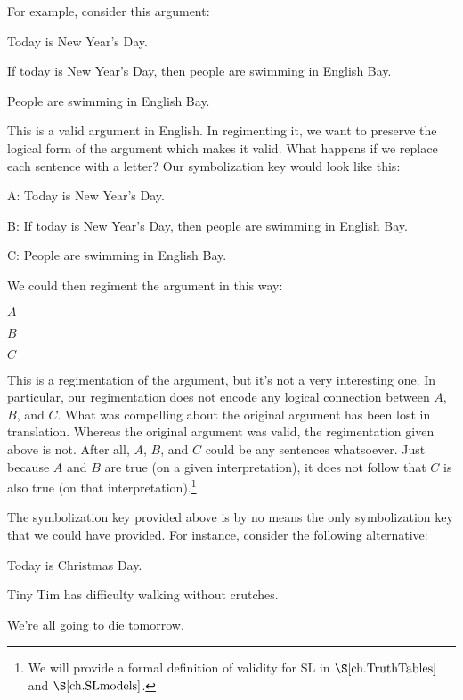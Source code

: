For example, consider this argument:

\begin{earg}
\item[] Today is New Year's Day.
\item[] If today is New Year's Day, then people are swimming in English Bay.
\item[\therefore] People are swimming in English Bay.
\end{earg}

This is a valid argument in English.
In regimenting it, we want to preserve the logical form of the argument which makes it valid.
What happens if we replace each sentence with a letter? 
Our symbolization key would look like this:

\begin{ekey}
\item[A:]Today is New Year's Day.
\item[B:]If today is New Year's Day, then people are swimming in English Bay.
\item[C:]People are swimming in English Bay.
\end{ekey}

We could then regiment the argument in this way:

\begin{earg}
\item[] $A$
\item[] $B$
\item[\therefore] $C$
\end{earg}

This is a regimentation of the argument, but it's not a very interesting one.
In particular, our regimentation does not encode any logical connection between $A$, $B$, and $C$.
What was compelling about the original argument has been lost in translation.
Whereas the original argument was valid, the regimentation given above is not.
After all, $A$, $B$, and $C$ could be any sentences whatsoever.
Just because $A$ and $B$ are true (on a given interpretation), it does not follow that $C$ is also true (on that interpretation).\footnote{We will provide a formal definition of validity for SL in $\S\ref{ch.TruthTables}$ and $\S\ref{ch.SLmodels}$.}

The symbolization key provided above is by no means the only symbolization key that we could have provided.
For instance, consider the following alternative:

\begin{ekey}
\item[]Today is Christmas Day.
\item[]Tiny Tim has difficulty walking without crutches.
\item[\therefore]We're all going to die tomorrow.
\end{ekey}

